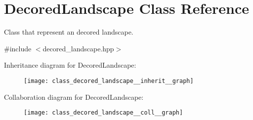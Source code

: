 \hypertarget{class_decored_landscape}{}\section{Decored\+Landscape Class Reference}
\label{class_decored_landscape}


Class that represent an decored landscape.  




{\ttfamily \#include $<$decored\+\_\+landscape.\+hpp$>$}



Inheritance diagram for Decored\+Landscape\+:\nopagebreak
\begin{figure}[H]
\begin{center}
\leavevmode
\texttt{[image: class\_decored\_landscape\_\_inherit\_\_graph]}
\end{center}
\end{figure}


Collaboration diagram for Decored\+Landscape\+:\nopagebreak
\begin{figure}[H]
\begin{center}
\leavevmode
\texttt{[image: class\_decored\_landscape\_\_coll\_\_graph]}
\end{center}
\end{figure}
